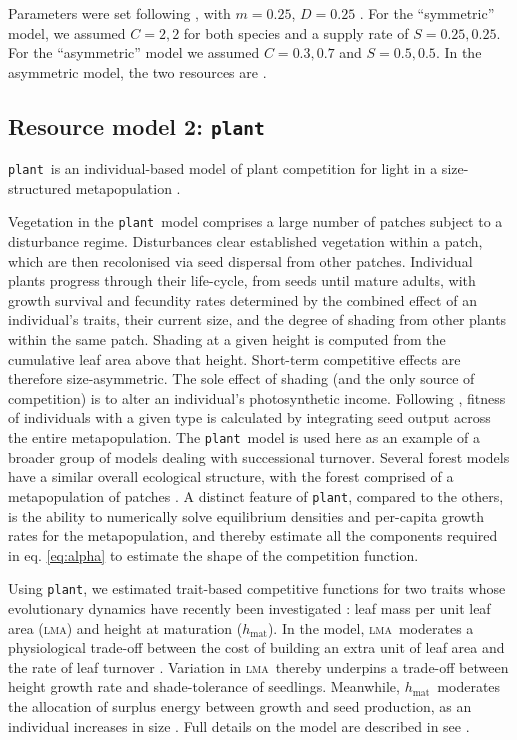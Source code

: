 \documentclass[a4paper,11pt]{article}
\newcommand{\verify}[1]{{\color{navy}{(verify: #1)}}}
\newcommand{\plant}{{\tt plant}}
\newcommand{\hmat}{\ensuremath{h_{\text{mat}}}}
\newcommand{\lma}{\textsc{lma}}
\begin{document}
Parameters were set following \citet{Fox-2008}, with $m = 0.25$, $D=0.25$ \verify{(GJK) true? Need to update parameters if model has been changed?}. For the ``symmetric'' model, we assumed $C = {2, 2}$ for both species and a supply rate of  $S = {0.25, 0.25}$.  For the ``asymmetric'' model we assumed $C = {0.3, 0.7}$ and $S = {0.5, 0.5}$. In the asymmetric model, the two resources are \verify{(GJK) consumed at a different by each species}.

\subsection{Resource model 2: \plant }

\plant\ is an individual-based model of plant competition for light in a size-structured metapopulation \citep{Falster-2016, Falster-2017}. 


Vegetation in the \plant\ model comprises a large number of patches subject to a disturbance regime. Disturbances clear established vegetation within a patch, which are then recolonised via seed dispersal from other patches. Individual plants progress through their life-cycle, from seeds until mature adults, with growth survival and fecundity rates determined by the combined effect of an individual's traits, their current size, and the degree of shading from other plants within the same patch. Shading at a given height is computed from the cumulative leaf area above that height. Short-term competitive effects are therefore size-asymmetric. The sole effect of shading (and the only source of competition) is to alter an individual's photosynthetic income. Following \citep{Falster-2017}, fitness of individuals with a given type is calculated by integrating seed output across the entire metapopulation. The \plant\ model is used here as an example of a broader group of models dealing with successional turnover. Several forest models have a similar overall ecological structure, with the forest comprised of a metapopulation of patches \citep{Huston-1987,Kohyama-1993,Moorcroft-2001, Medvigy-2012, Smith-2014}. A distinct feature of \plant, compared to the others, is the ability to numerically solve equilibrium densities and per-capita growth rates for the metapopulation, and thereby estimate all the components required in eq. \ref{eq:alpha} to estimate the shape of the competition function.

Using \plant, we estimated trait-based competitive functions for two traits whose evolutionary dynamics have recently been investigated \citep{Falster-2017}: leaf mass per unit leaf area (\lma) and height at maturation (\hmat). In the model, \lma\ moderates a physiological trade-off between the cost of building an extra unit of leaf area and the rate of leaf turnover \citep{Wright-2004}. Variation in \lma\ thereby underpins a trade-off between height growth rate and shade-tolerance of seedlings. Meanwhile, \hmat\ moderates the allocation of surplus energy between growth and seed production, as an individual increases in size \citep{Falster-2017}. Full details on the model are described in see \citet{Falster-2016, Falster-2017}.
\end{document}
